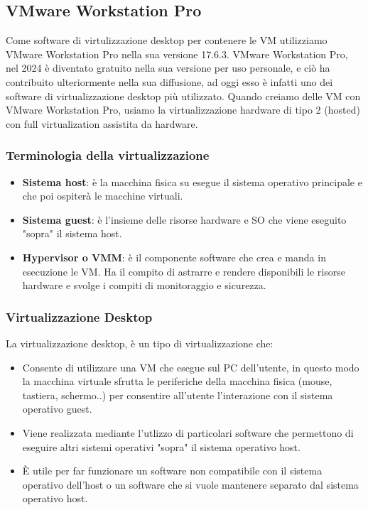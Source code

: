 \documentclass[12pt,a4paper,twoside]{book}
\begin{document}
\subsection{VMware Workstation Pro}
Come software di virtulizzazione desktop per contenere le \ac{VM} utilizziamo VMware Workstation Pro nella sua versione 17.6.3. VMware Workstation Pro, nel 2024 è diventato gratuito nella sua versione per uso personale, e ciò ha contribuito ulteriormente nella sua diffusione, ad oggi esso è infatti uno dei software di virtualizzazione desktop più utilizzato. \cite{ionos2024}
Quando creiamo delle \ac{VM} con VMware Workstation Pro, usiamo la virtualizzazione hardware di tipo 2 (hosted) con full virtualization assistita da hardware.

\subsubsection{Terminologia della virtualizzazione}
\begin{itemize}
    \item \textbf{Sistema host}: è la macchina fisica su esegue il sistema operativo principale e che poi ospiterà le macchine virtuali.
    \item \textbf{Sistema guest}: è l'insieme delle risorse hardware e SO che viene eseguito "sopra" il sistema host.
    \item \textbf{Hypervisor o \ac{VMM}}: è il componente software che crea e manda in esecuzione le \ac{VM}. Ha il compito di astrarre e rendere disponibili le risorse hardware e svolge i compiti di monitoraggio e sicurezza.
\end{itemize}

\subsubsection{Virtualizzazione Desktop}
La virtualizzazione desktop, è un tipo di virtualizzazione che:
\begin{itemize}
    \item Consente di utilizzare una \ac{VM} che esegue sul PC dell'utente, in questo modo la macchina virtuale sfrutta le periferiche della macchina fisica (mouse, tastiera, schermo..) per consentire all'utente l'interazione con il sistema operativo guest.
    \item Viene realizzata mediante l'utlizzo di particolari software che permettono di eseguire altri sistemi operativi "sopra" il sistema operativo host.
    \item È utile per far funzionare un software non compatibile con il sistema operativo dell'host o un software che si vuole mantenere separato dal sistema operativo host.
\end{itemize}
\end{document}
